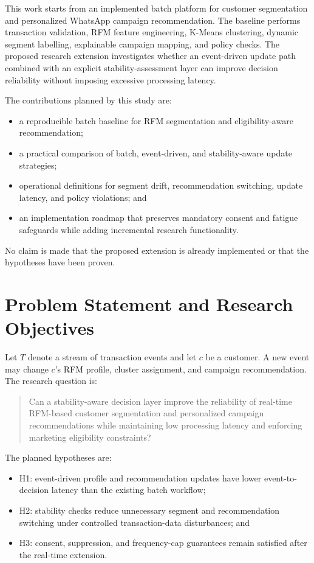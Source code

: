 \documentclass[conference]{IEEEtran}
\begin{document}
This work starts from an implemented batch platform for customer segmentation and personalized WhatsApp campaign recommendation. The baseline performs transaction validation, RFM feature engineering, K-Means clustering, dynamic segment labelling, explainable campaign mapping, and policy checks. The proposed research extension investigates whether an event-driven update path combined with an explicit stability-assessment layer can improve decision reliability without imposing excessive processing latency.

The contributions planned by this study are:
\begin{itemize}
    \item a reproducible batch baseline for RFM segmentation and eligibility-aware recommendation;
    \item a practical comparison of batch, event-driven, and stability-aware update strategies;
    \item operational definitions for segment drift, recommendation switching, update latency, and policy violations; and
    \item an implementation roadmap that preserves mandatory consent and fatigue safeguards while adding incremental research functionality.
\end{itemize}
No claim is made that the proposed extension is already implemented or that the hypotheses have been proven.

\section{Problem Statement and Research Objectives}
Let $T$ denote a stream of transaction events and let $c$ be a customer. A new event may change $c$'s RFM profile, cluster assignment, and campaign recommendation. The research question is:

\begin{quote}
Can a stability-aware decision layer improve the reliability of real-time RFM-based customer segmentation and personalized campaign recommendations while maintaining low processing latency and enforcing marketing eligibility constraints?
\end{quote}

The planned hypotheses are:
\begin{itemize}
    \item H1: event-driven profile and recommendation updates have lower event-to-decision latency than the existing batch workflow;
    \item H2: stability checks reduce unnecessary segment and recommendation switching under controlled transaction-data disturbances; and
    \item H3: consent, suppression, and frequency-cap guarantees remain satisfied after the real-time extension.
\end{itemize}
\end{document}
